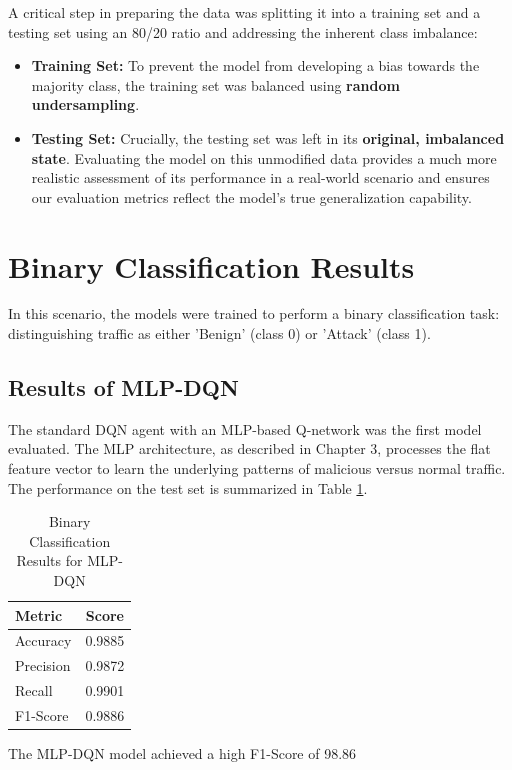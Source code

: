 \documentclass{report}
\begin{document}
A critical step in preparing the data was splitting it into a training set and a testing set using an 80/20 ratio and addressing the inherent class imbalance:
\begin{itemize}
    \item \textbf{Training Set:} To prevent the model from developing a bias towards the majority class, the training set was balanced using \textbf{random undersampling}.
    \item \textbf{Testing Set:} Crucially, the testing set was left in its \textbf{original, imbalanced state}. Evaluating the model on this unmodified data provides a much more realistic assessment of its performance in a real-world scenario and ensures our evaluation metrics reflect the model's true generalization capability.
\end{itemize}\section{Binary Classification Results}
In this scenario, the models were trained to perform a binary classification task: distinguishing traffic as either 'Benign' (class 0) or 'Attack' (class 1).

\subsection{Results of MLP-DQN}
The standard DQN agent with an MLP-based Q-network was the first model evaluated. The MLP architecture, as described in Chapter 3, processes the flat feature vector to learn the underlying patterns of malicious versus normal traffic. The performance on the test set is summarized in Table \ref{tab:binary_dqn_results}.

\begin{table}[H]
    \centering
    \caption{Binary Classification Results for MLP-DQN}
    \label{tab:binary_dqn_results}
    \begin{tabular}{@{}lc@{}}
        \toprule
        \textbf{Metric} & \textbf{Score} \\
        \midrule
        Accuracy & 0.9885 \\
        Precision & 0.9872 \\
        Recall & 0.9901 \\
        F1-Score & 0.9886 \\
        \bottomrule
    \end{tabular}
\end{table}

The MLP-DQN model achieved a high F1-Score of 98.86%
\end{document}
